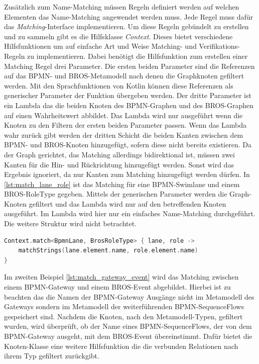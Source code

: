 Zusätzlich zum Name-Matching müssen Regeln definiert werden auf welchen Elementen das Name-Matching angewendet werden muss.
Jede Regel muss dafür das \emph{Matching}-Interface implementieren.
Um diese Regeln gebündelt zu erstellen und zu sammeln gibt es die Hilfsklasse \emph{Context}.
Dieses bietet verschiedene Hilfsfunktionen um auf einfache Art und Weise Matching- und Verifikations-Regeln zu implementieren.
Dabei benötigt die Hilfsfunktion zum erstellen einer Matching Regel drei Parameter.
Die ersten beiden Parameter sind die Referenzen auf das BPMN- und BROS-Metamodell nach denen die Graphknoten gefiltert werden.
Mit den Sprachfunktionen von Kotlin können diese Referenzen als generischer Parameter der Funktion übergeben werden.
Der dritte Parameter ist ein Lambda das die beiden Knoten des BPMN-Graphen und des BROS-Graphen auf einen Wahrheitswert abbildet.
Das Lambda wird nur ausgeführt wenn die Knoten zu den Filtern der ersten beiden Parameter passen.
Wenn das Lambda wahr zurück gibt werden der dritten Schicht die beiden Kanten zwischen dem BPMN- und BROS-Knoten hinzugefügt, sofern diese nicht bereits existieren.
Da der Graph gerichtet, das Matching allerdings bidirektional ist, müssen zwei Kanten für die Hin- und Rückrichtung hinzugefügt werden.
Sonst wird das Ergebnis ignoriert, da nur Kanten zum Matching hinzugefügt werden dürfen.
In \cref{lst:match_lane_role} ist das Matching für eine BPMN-Swimlane und einem BROS-RoleType gegeben.
Mittels der generischen Parameter werden die Graph-Knoten gefiltert und das Lambda wird nur auf den betreffenden Knoten ausgeführt. 
Im Lambda wird hier nur ein einfaches Name-Matching durchgeführt.
Die weitere Struktur wird nicht betrachtet.

\begin{lstlisting}[language=Kotlin, caption=Matching Regel von einer BPMN-SwimLane und einem BROS-RoleType, label=lst:match_lane_role]
Context.match<BpmnLane, BrosRoleType> { lane, role ->
    matchStrings(lane.element.name, role.element.name)
}
\end{lstlisting}

Im zweiten Beispiel \cref{lst:match_gateway_event} wird das Matching zwischen einem BPMN-Gateway und einem BROS-Event abgebildet.
Hierbei ist zu beachten das die Namen der BPMN-Gateway Ausgänge nicht im Metamodell des Gateways sondern im Metamodell der weiterführenden BPMN-SequenceFlows gespeichert sind.
Nachdem die Knoten, nach den Metamodell-Typen, gefiltert wurden, wird überprüft, ob der Name eines BPMN-SequenceFlows, der von dem BPMN-Gateway ausgeht, mit dem BROS-Event übereinstimmt.
Dafür bietet die Knoten-Klasse eine weitere Hilfsfunktion die die verbunden Relationen nach ihrem Typ gefiltert zurückgibt.

